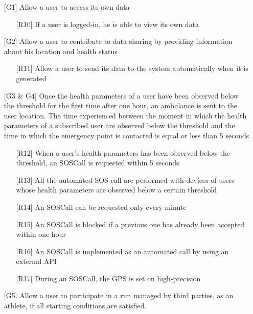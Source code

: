 \begin{itemize}
\item [{[G1]}] Allow a user to access its own data
	\begin{itemize}
	\item[{[R10]}] If a user is logged-in, he is able to view its own data
	\end{itemize}
\item[{[G2]}] Allow a user to contribute to data sharing by providing information about his location and health status
	\begin{itemize}
	\item[{[R11]}] Allow a user to send its data to the system automatically when it is generated
	\end{itemize}
\item[{[G3 \& G4]}] Once the health parameters of a user have been observed 
below the threshold for the first time after one hour, an ambulance is sent to the user location. 
The time experienced between the moment in which the health parameters of a subscribed user are observed below the threshold and the time in which the emergency point is contacted is equal or less than 5 seconds
	\begin{itemize}
	\item[{[R12]}] When a user's health parameters has been observed below the threshold, an SOSCall is requested within 5 seconds
	\item[{[R13]}] All the automated SOS call are performed with devices of users whose health parameters are observed below a certain threshold
	\item[{[R14]}] An SOSCall can be requested only every minute
	\item[{[R15]}] An SOSCall is blocked if a previous one has already been accepted within one hour
	\item[{[R16]}] An SOSCall is implemented as an automated call by using an external API
	\item[{[R17]}] During an SOSCall, the GPS is set on high-precision
	\end{itemize}
\item[{[G5]}] Allow a user to participate in a run managed by third parties, as an athlete, if all starting conditions are satisfied.
	\begin{itemize}


\end{itemize}
\end{itemize}
